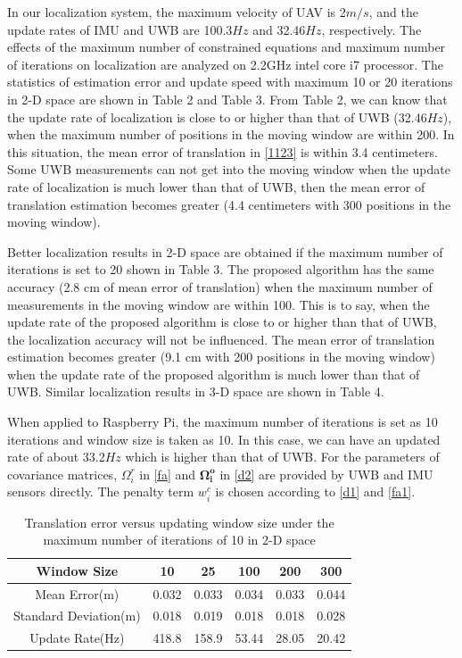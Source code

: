 \documentclass[journal]{IEEEtran}
\begin{document}
In our localization system, the maximum velocity of UAV is 2$m/s$, and the update rates of IMU and UWB are 100.3$Hz$ and 32.46$Hz$, respectively. The effects of the maximum number of constrained equations and maximum number of iterations on localization are analyzed on 2.2GHz intel core i7 processor. 
The statistics of estimation error and update speed with maximum 10 or 20 iterations in 2-D space are shown in Table 2 and Table 3. From Table 2, we can know that the update rate of localization is close to or higher than that of UWB (32.46$Hz$), when the maximum number of positions in the moving window are within 200. In this situation, the mean error of translation in \eqref{1123} is within 3.4 centimeters. Some UWB measurements can not get into the moving window when the update rate of localization is much lower than that of UWB, then the mean error of translation estimation becomes greater (4.4 centimeters with 300 positions in the moving window).

Better localization results in 2-D space are obtained if the maximum number of iterations is set to 20 shown in Table 3. The proposed algorithm has the same accuracy (2.8 cm of mean error of translation) when the maximum number of measurements in the moving window are within 100. This is to say, when the update rate of the proposed algorithm is close to or higher than that of UWB, the localization accuracy will not be influenced. The mean error of translation estimation becomes greater (9.1 cm with 200 positions in the moving window) when the update rate of the proposed algorithm is much lower than that of UWB. Similar localization results in 3-D space are shown in Table 4.

When applied to Raspberry Pi, the maximum number of iterations is set as 10 iterations and window size is taken as 10. In this case, we can have an updated rate of about 33.2$Hz$ which is higher than that of UWB. 
For the parameters of covariance matrices, $\Omega_i^{r}$ in \eqref{fa} and $\mathbf{\Omega^{o}_{i}}$ in \eqref{d2} are provided by UWB and IMU sensors directly. The penalty term $w_i^{c}$ is chosen according to \eqref{d1} and \eqref{fa1}.




\begin{table}[ht!]
  \begin{center}
  \caption{Translation error versus updating window size under the maximum number of iterations of 10 in 2-D space}
  \label{errortable2}
        \begin{tabular}{c|c|c|c|c|c}
        \hline\hline
         Window Size & 10  &25 &  100  & 200 &300\\
        \hline
         Mean Error(m) &0.032 &0.033 & 0.034 &  0.033 &0.044 \\
        Standard Deviation(m)&0.018 &0.019  & 0.018 &  0.018 & 0.028 \\
        Update Rate(Hz)&418.8 &158.9 & 53.44 &  28.05 &20.42 \\
        \hline\hline
        \end{tabular}
  \end{center}
\end{table}
\end{document}
